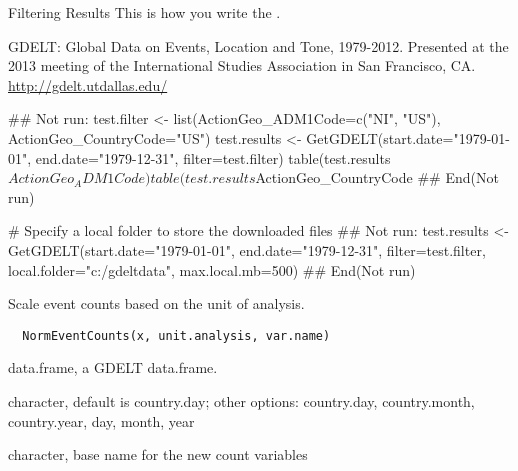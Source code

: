 \documentclass[a4paper]{book}
\begin{document}
%
\begin{Section}{Filtering Results}
This is how you write the .
\end{Section}
%
\begin{Author}\relax

\end{Author}
%
\begin{References}\relax
GDELT: Global Data on Events, Location and Tone,
1979-2012. Presented at the 2013 meeting of the
International Studies Association in San Francisco, CA.
\url{http://gdelt.utdallas.edu/}
\end{References}
%
\begin{Examples}
\begin{ExampleCode}
## Not run: 
test.filter <- list(ActionGeo_ADM1Code=c("NI", "US"), ActionGeo_CountryCode="US")
test.results <- GetGDELT(start.date="1979-01-01", end.date="1979-12-31", filter=test.filter)
table(test.results$ActionGeo_ADM1Code)
table(test.results$ActionGeo_CountryCode
## End(Not run)

# Specify a local folder to store the downloaded files
## Not run: 
test.results <- GetGDELT(start.date="1979-01-01", end.date="1979-12-31",
                         filter=test.filter,
                         local.folder="c:/gdeltdata",
                         max.local.mb=500)
## End(Not run)
\end{ExampleCode}
\end{Examples}
%
\begin{Description}\relax
Scale event counts based on the unit of analysis.
\end{Description}
%
\begin{Usage}
\begin{verbatim}
  NormEventCounts(x, unit.analysis, var.name)
\end{verbatim}
\end{Usage}
%
\begin{Arguments}
\begin{ldescription}
\item[\code{x}] data.frame, a GDELT data.frame.

\item[\code{unit.analysis}] character, default is country.day;
other options: country.day, country.month, country.year,
day, month, year

\item[\code{var.name}] character, base name for the new count
variables
\end{ldescription}
\end{Arguments}
\end{document}
